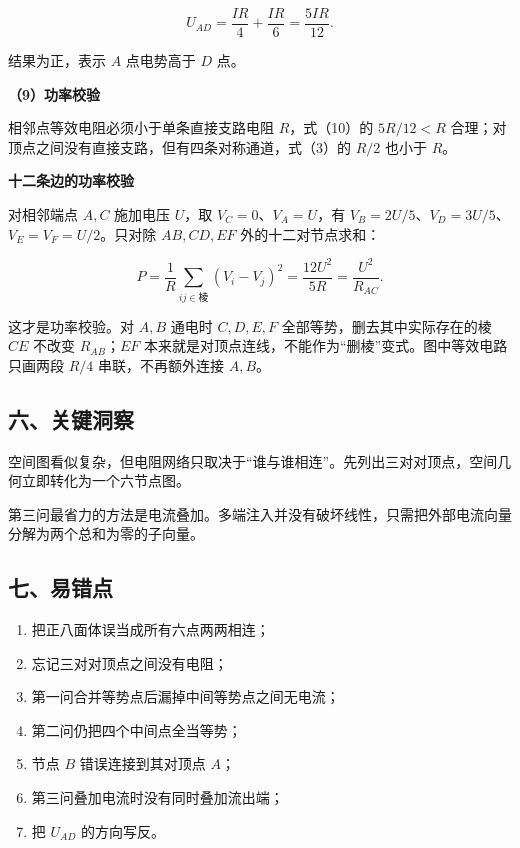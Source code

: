 \documentclass[12pt,a4paper,UTF8]{ctexart}
\newcommand{\tightlist}{\setlength{\itemsep}{0pt}\setlength{\parskip}{0pt}}
\begin{document}
\[
\boxed{
U_{AD}
=\frac{IR}{4}+\frac{IR}{6}
=\frac{5IR}{12}
}.
\tag{15}
\]

结果为正，表示 \(A\) 点电势高于 \(D\) 点。

\textbf{（9）功率校验}

相邻点等效电阻必须小于单条直接支路电阻 \(R\)，式（10）的 \(5R/12<R\)
合理；对顶点之间没有直接支路，但有四条对称通道，式（3）的 \(R/2\) 也小于
\(R\)。

\textbf{十二条边的功率校验}

对相邻端点 \(A,C\) 施加电压 \(U\)，取 \(V_C=0\)、\(V_A=U\)，有
\(V_B=2U/5\)、\(V_D=3U/5\)、\(V_E=V_F=U/2\)。只对除 \(AB,CD,EF\)
外的十二对节点求和：

\[P=\frac1R\sum_{ij\in\text{棱}}(V_i-V_j)^2=\frac{12U^2}{5R}=\frac{U^2}{R_{AC}}.\]

这才是功率校验。对 \(A,B\) 通电时 \(C,D,E,F\)
全部等势，删去其中实际存在的棱 \(CE\) 不改变 \(R_{AB}\)；\(EF\)
本来就是对顶点连线，不能作为``删棱''变式。图中等效电路只画两段 \(R/4\)
串联，不再额外连接 \(A,B\)。

\subsection{六、关键洞察}\label{ux516dux5173ux952eux6d1eux5bdf-1}

空间图看似复杂，但电阻网络只取决于``谁与谁相连''。先列出三对对顶点，空间几何立即转化为一个六节点图。

第三问最省力的方法是电流叠加。多端注入并没有破坏线性，只需把外部电流向量分解为两个总和为零的子向量。

\subsection{七、易错点}\label{ux4e03ux6613ux9519ux70b9-1}

\begin{enumerate}
\def\labelenumi{\arabic{enumi}.}
\tightlist
\item
  把正八面体误当成所有六点两两相连；
\item
  忘记三对对顶点之间没有电阻；
\item
  第一问合并等势点后漏掉中间等势点之间无电流；
\item
  第二问仍把四个中间点全当等势；
\item
  节点 \(B\) 错误连接到其对顶点 \(A\)；
\item
  第三问叠加电流时没有同时叠加流出端；
\item
  把 \(U_{AD}\) 的方向写反。
\end{enumerate}
\end{document}

